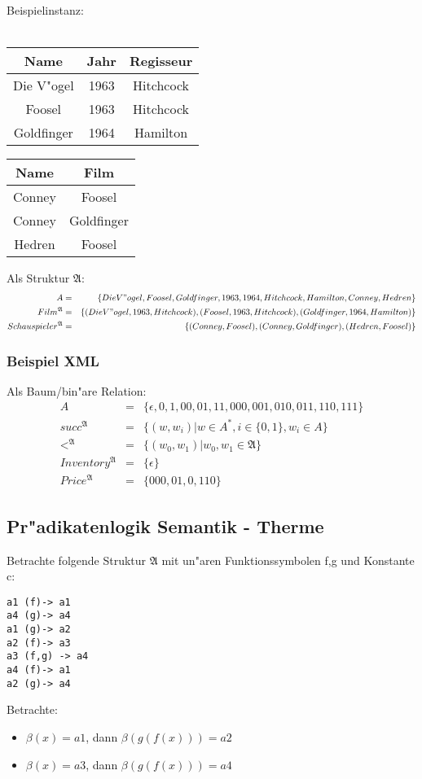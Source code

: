 Beispielinstanz: \\ \\
\begin{tabular}{|c|c|c|}
Name & Jahr & Regisseur \\
\hline
Die V"ogel & 1963 & Hitchcock \\
Foosel & 1963 & Hitchcock \\
Goldfinger & 1964 & Hamilton \\
\hline
\end{tabular} \begin{tabular}{|c|c|}
Name & Film \\
\hline
Conney & Foosel \\
Conney & Goldfinger \\
Hedren & Foosel \\
\hline
\end{tabular}

Als Struktur $\mathfrak{A}$:
\begin{eqnarray*}
A &=& \{Die V"ogel, Foosel, Goldfinger, 1963, 1964, Hitchcock, Hamilton, Conney, Hedren\}\\
Film^{\mathfrak{A}} &=& \{ (Die V"ogel, 1963, Hitchcock),
               (Foosel, 1963, Hitchcock),
               (Goldfinger, 1964, Hamilton) \} \\
Schauspieler^{\mathfrak{A}} &=& \{ (Conney, Foosel), (Conney,Goldfinger), (Hedren,Foosel)\}
\end{eqnarray*}

\subsubsection{Beispiel XML}
Als Baum/bin"are Relation:
\begin{eqnarray*}
A &=& \{\epsilon , 0, 1, 00, 01, 11, 000, 001, 010, 011, 110, 111\} \\
succ^{\mathfrak{A}} &=& \{(w, w_i) | w \in A^{*}, i \in \{0,1\}, w_i \in A \} \\
<^{\mathfrak{A}} &=& \{ (w_0, w_1) | w_0,w_1 \in \mathfrak{A}\} \\
Inventory^{\mathfrak{A}} &=& \{ \epsilon \} \\
Price^{\mathfrak{A}} &=& \{ 000, 01,0, 110 \}
\end{eqnarray*}

\subsection{Pr"adikatenlogik Semantik - Therme}
Betrachte folgende Struktur $\mathfrak{A}$ mit un"aren Funktionssymbolen f,g und Konstante c:

\begin{verbatim}
a1 (f)-> a1
a4 (g)-> a4
a1 (g)-> a2
a2 (f)-> a3
a3 (f,g) -> a4
a4 (f)-> a1
a2 (g)-> a4
\end{verbatim}

Betrachte:
\begin{itemize}
\item $\beta(x) = a1$, dann $\beta( g( f(x) ) ) = a2$
\item $\beta(x) = a3$, dann $\beta( g( f(x) ) ) = a4$
\end{itemize}

